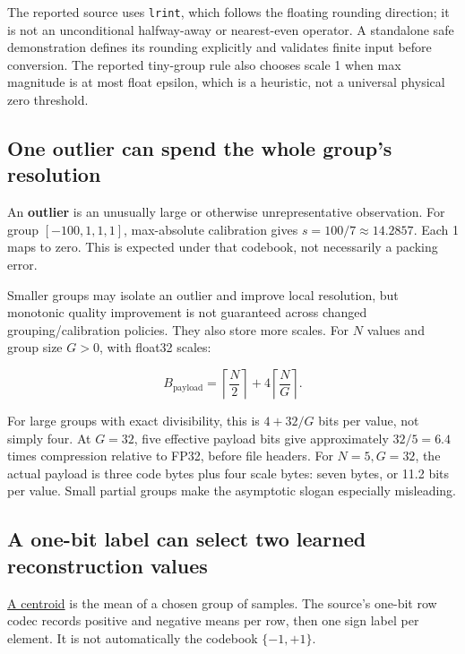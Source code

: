 The reported source uses \texttt{lrint}, which follows the floating rounding direction; it is not an unconditional halfway-away or nearest-even operator. A standalone safe demonstration defines its rounding explicitly and validates finite input before conversion. The reported tiny-group rule also chooses scale 1 when max magnitude is at most float epsilon, which is a heuristic, not a universal physical zero threshold.

\subsection{One outlier can spend the whole group's resolution}\label{01-foundations-i-ch001-one-outlier-can-spend-the-whole-groups-resolution}

An \textbf{outlier} is an unusually large or otherwise unrepresentative observation. For group \([-100,1,1,1]\), max-absolute calibration gives \(s=100/7\approx14.2857\). Each 1 maps to zero. This is expected under that codebook, not necessarily a packing error.

Smaller groups may isolate an outlier and improve local resolution, but monotonic quality improvement is not guaranteed across changed grouping/calibration policies. They also store more scales. For \(N\) values and group size \(G>0\), with float32 scales:

\[
B_{\mathrm{payload}}=
\left\lceil\frac N2\right\rceil
+4\left\lceil\frac NG\right\rceil.
\]

For large groups with exact divisibility, this is \(4+32/G\) bits per value, not simply four. At \(G=32\), five effective payload bits give approximately \(32/5=6.4\) times compression relative to FP32, before file headers. For \(N=5,G=32\), the actual payload is three code bytes plus four scale bytes: seven bytes, or 11.2 bits per value. Small partial groups make the asymptotic slogan especially misleading.

\subsection{A one-bit label can select two learned reconstruction values}\label{01-foundations-i-ch001-a-one-bit-label-can-select-two-learned-reconstruction-values}

\hyperref[appendix-4ccd7a775813]{A centroid} is the mean of a chosen group of samples. The source's one-bit row codec records positive and negative means per row, then one sign label per element. It is not automatically the codebook \(\{-1,+1\}\).

